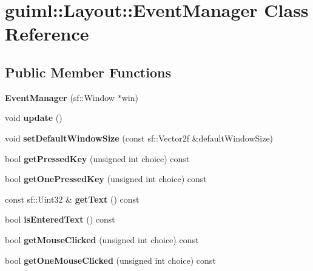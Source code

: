 \section{guiml\-:\-:Layout\-:\-:Event\-Manager Class Reference}
\label{classguiml_1_1_layout_1_1_event_manager}
\subsection*{Public Member Functions}
\begin{DoxyCompactItemize}
\item 
{\bfseries Event\-Manager} (sf\-::\-Window $\ast$win)\label{classguiml_1_1_layout_1_1_event_manager_a813407eb44448215d0aae6f373f6dc34}

\item 
void {\bfseries update} ()\label{classguiml_1_1_layout_1_1_event_manager_ac70d2fbb02931654c371c3a4712fa711}

\item 
void {\bfseries set\-Default\-Window\-Size} (const sf\-::\-Vector2f \&default\-Window\-Size)\label{classguiml_1_1_layout_1_1_event_manager_a2b5d78cffc2f508d4d15ae79f9e8c0d3}

\item 
bool {\bfseries get\-Pressed\-Key} (unsigned int choice) const \label{classguiml_1_1_layout_1_1_event_manager_a1e7f36a3021931855292ea5f33a67e70}

\item 
bool {\bfseries get\-One\-Pressed\-Key} (unsigned int choice) const \label{classguiml_1_1_layout_1_1_event_manager_af09afaf637ebae3e4860ded1560d6c76}

\item 
const sf\-::\-Uint32 \& {\bfseries get\-Text} () const \label{classguiml_1_1_layout_1_1_event_manager_ac789e95cdf6fc61747afcb1c523b8a5e}

\item 
bool {\bfseries is\-Entered\-Text} () const \label{classguiml_1_1_layout_1_1_event_manager_a2542f1bb5b0ebfc16dff1e0bca64aab8}

\item 
bool {\bfseries get\-Mouse\-Clicked} (unsigned int choice) const \label{classguiml_1_1_layout_1_1_event_manager_af0a065e816e3b6a7d0b08090916b2a81}

\item 
bool {\bfseries get\-One\-Mouse\-Clicked} (unsigned int choice) const \label{classguiml_1_1_layout_1_1_event_manager_a44231afff33dad504a6b6bda892b9ef8}


\end{DoxyCompactItemize}

